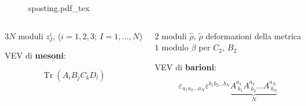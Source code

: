 \documentclass[aspectratio=43,mathserif]{beamer}
\newcommand{\tr}{\operatorname{Tr}}
\newcommand{\hatt}[1]{\ensuremath{\widehat{#1}}}
\newcommand{\tildd}[1]{\ensuremath{\widetilde{#1}}}
\begin{document}
\begin{frame}

	\vspace{-12pt}

	\begin{figure}[h!]\centering
	\def\svgscale{0.6}
	{sposting.pdf_tex}
	\end{figure}

	\vspace{-20pt}

	\begin{columns}
		\begin{column}{0.5\textwidth}
			\begin{center}	
				$3N$ moduli {\Large $z_I^i$}, (${\scriptstyle i=1,2,3; \,I = 1,\ldots,N}$)
			\end{center}

			\vfill VEV di \textbf{mesoni}:
	
	\begin{equation}
		\tr \left( A_i B_j C_k D_l \right)
		\label{}
	\end{equation}

		\end{column}
		\begin{column}{0.5\textwidth}

			\vspace{-13pt}
			$2$ moduli $\hatt\rho$, $\tildd\rho$ deformazioni della metrica\\
			
			\vspace{10pt} $1$ modulo $\beta$ per $C_2$, $B_2$


			\vspace{10pt}VEV di \textbf{barioni}:

			\vspace{-13pt}
	\begin{equation}
		\varepsilon_{a_1 a_2 \ldots a_N} \varepsilon^{b_1 b_2 \ldots b_N} \underbrace{A^{a_1}_{\;b_1} A^{a_2}_{\;b_2} \ldots A^{a_N}_{\;b_N} }_{N}
		\label{}
	\end{equation}



		\end{column}\end{columns}



\end{frame}
\end{document}
